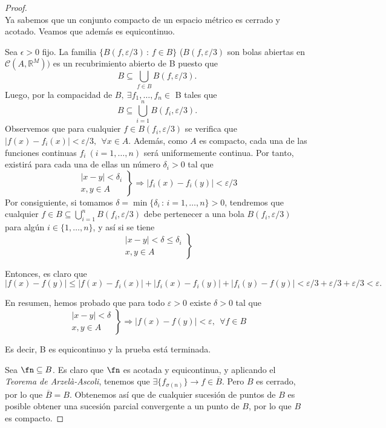   \begin{proof} \hfill \\
    \boxed{\Rightarrow} Ya sabemos que un conjunto compacto de un espacio métrico es cerrado y acotado. Veamos que además es equicontinuo.

    Sea $\epsilon >0$ fijo. La familia $\{ B(f, \varepsilon/3) \, : \, f\in B\}$ ($B(f, \varepsilon/3)$ son bolas abiertas en $\mathcal{C}(A, \mathbb{R}^M))$ es un recubrimiento abierto de B puesto que $$B\subseteq \bigcup_{f\in B} B(f, \varepsilon/3).$$
    Luego, por la compacidad de $B,\ \exists f_1, \dots, f_n \in$ B tales que $$B \subseteq \displaystyle \bigcup_{i=1}^n B(f_i, \varepsilon/3).$$
    Observemos que para cualquier $f\in B(f_i, \varepsilon/3)$ se verifica que
    $|f(x)-f_i(x)| < \varepsilon/3 , \ \ \forall x\in A$. Además, como $A$ es compacto, cada una de las funciones continuas $f_i \ (i=1,\dots,n)$ será uniformemente continua. Por tanto, existirá para cada una de ellas un número $\delta_i>0$ tal que $$\left. \begin{array}{c} |x-y|<\delta_i \\ x,y\in A \end{array}  \right\} \Rightarrow |f_i(x)-f_i(y)| <\varepsilon/3$$
    Por consiguiente, si tomamos $\delta = \min \{\delta_i \, :\, i=1,\dots,n\} >0$, tendremos que cualquier $f\in B \subseteq \bigcup_{i=1}^n B(f_i, \varepsilon/3)$ debe pertenecer a una bola $B(f_i, \varepsilon/3)$ para algún $i\in\{1,\dots ,n\}$, y así si se tiene $$\left. \begin{array}{c} |x-y|<\delta \leq \delta_i \\ x,y\in A \end{array}  \right\}$$

    Entonces, es claro que $\displaystyle |f(x)-f(y)| \le |f(x)-f_i(x)|+|f_i(x)-f_i(y)|+|f_i(y)-f(y)| < \varepsilon/3+\varepsilon/3+\varepsilon/3<\varepsilon.$

    En resumen, hemos probado que para todo $\varepsilon >0$ existe $\delta >0$ tal que $$ \left. \begin{array}{c} |x-y|<\delta  \\ x,y\in A \end{array}  \right\} \Rightarrow |f(x)-f(y)| <\varepsilon , \ \ \forall f\in B$$

    Es decir, B es equicontinuo y la prueba está terminada.

    \boxed{\Leftarrow} Sea $\fn \subseteq B$. Es claro que $\fn$ es acotada y equicontinua, y aplicando el \textit{Teorema de Arzelà-Ascoli}, tenemos que $\exists \{f_{\sigma(n)}\} \to f \in \overline{B}$. Pero $B$ es cerrado, por lo que $\overline{B} = B$. Obtenemos así que de cualquier sucesión de puntos de $B$ es posible obtener una sucesión parcial convergente a un punto de $B$, por lo que $B$ es compacto.
  \end{proof}

